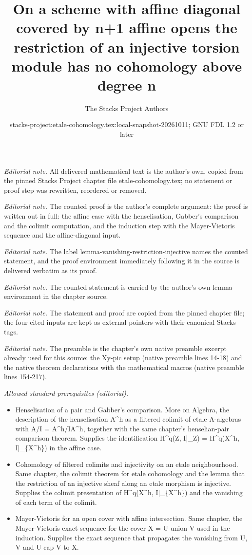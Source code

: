 \documentclass[10pt,a4paper]{amsart}
\title{On a scheme with affine diagonal covered by n+1 affine opens the restriction of an injective torsion module has no cohomology above degree n}
\author{The Stacks Project Authors}
\date{stacks-project:etale-cohomology.tex:local-snapshot-20261011; GNU FDL 1.2 or later}
\theoremstyle{plain}
\theoremstyle{definition}
\theoremstyle{remark}
\numberwithin{equation}{subsection}
\begin{document}
\maketitle
\noindent\textit{Editorial note.} All delivered mathematical text is the author's own, copied from the pinned Stacks Project chapter file etale-cohomology.tex; no statement or proof step was rewritten, reordered or removed.\par\medskip
\noindent\textit{Editorial note.} The counted proof is the author's complete argument: the proof is written out in full: the affine case with the henselisation, Gabber's comparison and the colimit computation, and the induction step with the Mayer-Vietoris sequence and the affine-diagonal input.\par\medskip
\noindent\textit{Editorial note.} The label lemma-vanishing-restriction-injective names the counted statement, and the proof environment immediately following it in the source is delivered verbatim as its proof.\par\medskip
\noindent\textit{Editorial note.} The counted statement is carried by the author's own lemma environment in the chapter source.\par\medskip
\noindent\textit{Editorial note.} The statement and proof are copied from the pinned chapter file; the four cited inputs are kept as external pointers with their canonical Stacks tags.\par\medskip
\noindent\textit{Editorial note.} The preamble is the chapter's own native preamble excerpt already used for this source: the Xy-pic setup (native preamble lines 14-18) and the native theorem declarations with the mathematical macros (native preamble lines 154-217).\par\medskip
\noindent\textit{Allowed standard prerequisites (editorial).}\begin{itemize}
\item Henselisation of a pair and Gabber's comparison. More on Algebra, the description of the henselisation A\textasciicircum{}h as a filtered colimit of etale A-algebras with A/I = A\textasciicircum{}h/IA\textasciicircum{}h, together with the same chapter's henselian-pair comparison theorem. Supplies the identification H\textasciicircum{}q(Z, I|\_Z) = H\textasciicircum{}q(X\textasciicircum{}h, I|\_\{X\textasciicircum{}h\}) in the affine case.
\item Cohomology of filtered colimits and injectivity on an etale neighbourhood. Same chapter, the colimit theorem for etale cohomology and the lemma that the restriction of an injective sheaf along an etale morphism is injective. Supplies the colimit presentation of H\textasciicircum{}q(X\textasciicircum{}h, I|\_\{X\textasciicircum{}h\}) and the vanishing of each term of the colimit.
\item Mayer-Vietoris for an open cover with affine intersection. Same chapter, the Mayer-Vietoris exact sequence for the cover X = U union V used in the induction. Supplies the exact sequence that propagates the vanishing from U, V and U cap V to X.
\end{itemize}\medskip
\end{document}
